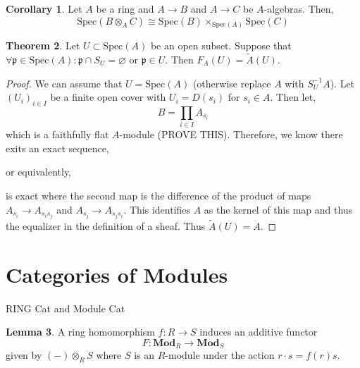 \documentclass[12pt]{article}
\newcommand{\Mod}[1]{\mathbf{Mod}_{#1}}
\newcommand{\Spec}[1]{\mathrm{Spec}\left( #1 \right)}
\newcommand{\p}{\mathfrak{p}}
\theoremstyle{remark}
\theoremstyle{definition}
\newtheorem{theorem}{Theorem}[section]
\newtheorem{lemma}[theorem]{Lemma}
\newtheorem{corollary}[theorem]{Corollary}
\newenvironment{definition}[1][Definition:]{\begin{trivlist}
\item[\hskip \labelsep {\bfseries #1}]}{\end{trivlist}}
\begin{document}
\begin{corollary}
Let $A$ be a ring and $A \to B$ and $A \to C$ be $A$-algebras. Then,
\[ \Spec{B \otimes_A C} \cong \Spec{B} \times_{\Spec{A}} \Spec{C} \]
\end{corollary}

\begin{theorem}
Let $U \subset \Spec{A}$ be an open subset. Suppose that $\forall \p \in \Spec{A} : \p \cap S_U = \varnothing \text{ or } \p \in U$. Then $F_A(U) = \tilde{A}(U)$.  
\end{theorem}

\begin{proof}
We can assume that $U = \Spec{A}$ (otherwise replace $A$ with $S_U^{-1} A$). Let $(U_i)_{i \in I}$ be a finite open cover with $U_i = D(s_i)$ for $s_i \in A$. Then let,
\[ B = \prod_{i \in I} A_{s_i} \]
which is a faithfully flat $A$-module (PROVE THIS). Therefore, we know there exits an exact sequence,
\begin{center}
\end{center}
or equivalently,
\begin{center}
\end{center}
is exact where the second map is the difference of the product of maps $A_{s_i} \to A_{s_i s_j}$ and $A_{s_j} \to A_{s_j s_i}$. This identifies $A$ as the kernel of this map and thus the equalizer in the definition of a sheaf. Thus $\tilde{A}(U) = A$.  
\end{proof}

\section{Categories of Modules}

\begin{definition}
RING Cat and Module Cat
\end{definition}

\begin{lemma}
A ring homomorphism $f : R \to S$ induces an additive functor \[F : \Mod{R} \to \Mod{S}\]
given by $ (-) \otimes_{R} S$ where $S$ is an $R$-module under the action $r \cdot s = f(r)s$. 
\end{lemma}
\end{document}
